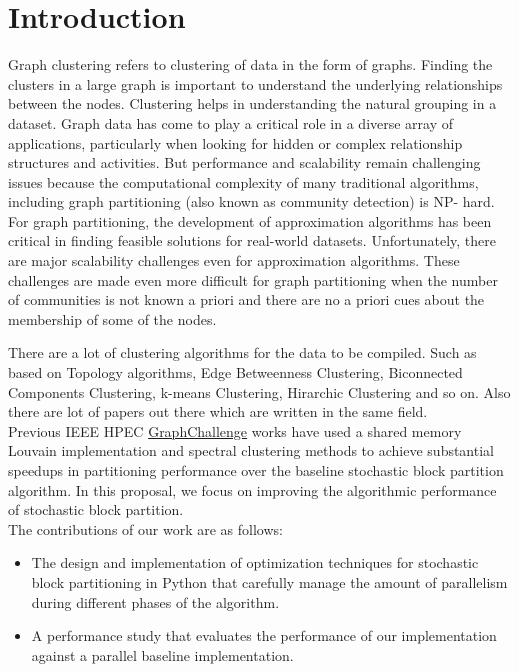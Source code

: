 \documentclass[conference]{IEEEtran}
\begin{document}
	\section{Introduction}
	Graph clustering refers to clustering of data in the form of graphs. Finding the clusters in a large graph is important to understand the underlying relationships between the nodes. Clustering helps in understanding the natural grouping in a dataset. Graph data has come to play a critical role in a diverse
array of applications, particularly when looking for hidden or
complex relationship structures and activities. But performance
and scalability remain challenging issues because the computational complexity of many traditional algorithms, including
graph partitioning (also known as community detection) is NP-
hard. For graph partitioning, the development of approximation
algorithms \cite{b1} has been critical in finding feasible solutions
for real-world datasets. Unfortunately, there are major scalability challenges even for approximation algorithms. These
challenges are made even more difficult for graph partitioning
when the number of communities is not known a priori and
there are no a priori cues about the membership of some of
the nodes.

	There are a lot of clustering algorithms for the data to be compiled. Such as based on Topology algorithms, Edge Betweenness Clustering, Biconnected Components Clustering, k-means Clustering, Hirarchic Clustering and so on. Also there are lot of papers out there which are written in the same field.
\\

	Previous IEEE HPEC \href{https://graphchallenge.mit.edu/}{GraphChallenge} works have used
a shared memory Louvain implementation and spectral
clustering methods to achieve substantial speedups in partitioning performance over the baseline stochastic block
partition algorithm. In this proposal, we focus on improving the
algorithmic performance of stochastic block partition.\\

The contributions of our work are as follows:

\begin{itemize}
	\item  The design and implementation of optimization
	techniques for stochastic block partitioning in Python
	that carefully manage
	the amount of parallelism during different phases of
	the algorithm.

	\item A performance study that evaluates the performance
	of our implementation against a parallel baseline implementation.\\
\end{itemize}
\end{document}
